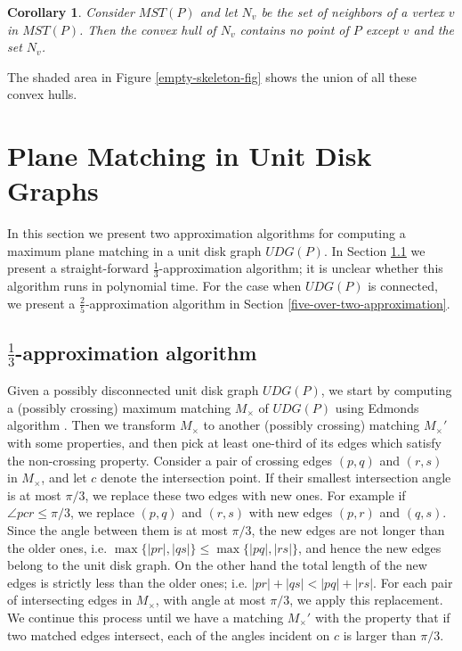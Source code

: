 \documentclass[11pt,a4paper]{article}
\newcommand{\MC}{M_\times}
\newtheorem{corollary}{Corollary}
\begin{document}
\begin{corollary}
\label{empty-convex-hull}
Consider $MST(P)$ and let $N_v$ be the set of neighbors of a vertex $v$ in $MST(P)$. Then the convex hull of $N_v$ contains no point of $P$ except $v$ and the set $N_v$.
\end{corollary}

The shaded area in Figure \ref{empty-skeleton-fig} shows the union of all these convex hulls.

\section{Plane Matching in Unit Disk Graphs}
\label{UDG}

In this section we present two approximation algorithms for computing a maximum plane matching in a unit disk graph $UDG(P)$. In Section \ref{three-approximation} we present a straight-forward $\frac{1}{3}$-approximation algorithm; it is unclear whether this algorithm runs in polynomial time. For the case when $UDG(P)$ is connected, we present a $\frac{2}{5}$-approximation algorithm in Section \ref{five-over-two-approximation}.

\subsection{$\frac{1}{3}$-approximation algorithm}
\label{three-approximation}

Given a possibly disconnected unit disk graph $UDG(P)$, we start by computing a (possibly crossing) maximum matching $\MC$ of $UDG(P)$ using Edmonds algorithm \cite{Edmonds1965}. Then we transform $\MC$ to another (possibly crossing) matching $\MC'$ with some properties, and then pick at least one-third of its edges which satisfy the non-crossing property. Consider a pair of crossing edges $(p,q)$ and $(r,s)$ in $\MC$, and let $c$ denote the intersection point. If their smallest intersection angle is at most $\pi/3$, we replace these two edges with new ones. For example if $\angle pcr \le \pi/3$, we replace $(p,q)$ and $(r,s)$ with new edges $(p,r)$ and $(q,s)$. Since the angle between them is at most $\pi/3$, the new edges are not longer than the older ones, i.e. $\max\{|pr|,|qs|\}\le\max\{|pq|,|rs|\}$, and hence the new edges belong to the unit disk graph. On the other hand the total length of the new edges is strictly less than the older ones; i.e. $|pr|+|qs|<|pq|+|rs|$. For each pair of intersecting edges in $\MC$, with angle at most $\pi/3$, we apply this replacement. We continue this process until we have a matching $\MC'$ with the property that if two matched edges intersect, each of the angles incident on $c$ is larger than $\pi/3$.
\end{document}
